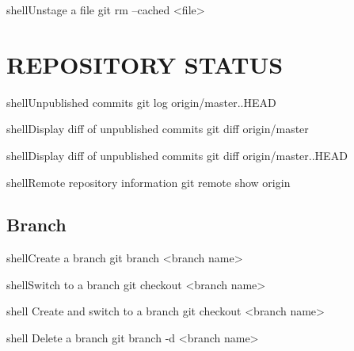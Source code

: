 \documentclass[10pt,a4paper]{article}
\begin{document}
\begin{multicols}{3}
\begin{codebox}{shell}{Unstage a file}
git rm --cached <file>

\end{codebox}

{\centering\section{REPOSITORY STATUS}}

\begin{codebox}{shell}{Unpublished commits}
git log origin/master..HEAD

\end{codebox}

\begin{codebox}{shell}{Display diff of unpublished commits}
git diff origin/master

\end{codebox}

\begin{codebox}{shell}{Display diff of unpublished commits}
git diff origin/master..HEAD

\end{codebox}

\begin{codebox}{shell}{Remote repository information}
git remote show origin

\end{codebox}

\subsection{Branch}

\begin{codebox}{shell}{Create a branch}
git branch <branch name>

\end{codebox}

\begin{codebox}{shell}{Switch to a branch}
git checkout <branch name>

\end{codebox}

\begin{codebox}{shell}{}
Create and switch to a branch
git checkout <branch name>

\end{codebox}

\begin{codebox}{shell}{}
Delete a branch
git branch -d <branch name>


\end{codebox}
\end{multicols}
\end{document}
